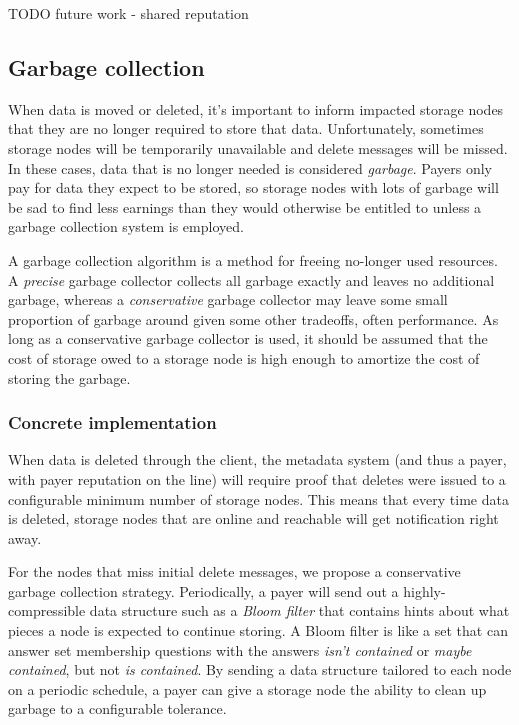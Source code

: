 \documentclass[a4paper,10pt]{article} \usepackage[utf8]{inputenc}
\newcommand{\todo}[1]{{\color{red} TODO #1 }}
\begin{document}
\todo{future work - shared reputation}

\subsection{Garbage collection}

When data is moved or deleted, it's important to inform impacted storage nodes
that they are no longer required to store that data. Unfortunately, sometimes
storage nodes will be temporarily unavailable and delete messages will be
missed. In these cases, data that is no longer needed is considered
{\em garbage}. Payers only pay for data they expect to be stored, so storage
nodes with lots of garbage will be sad to find less earnings than they would
otherwise be entitled to unless a garbage collection system is employed.

A garbage collection algorithm is a method for freeing no-longer used resources.
A {\em precise} garbage collector collects all garbage exactly and
leaves no additional garbage, whereas a {\em conservative} garbage collector may
leave some small proportion of garbage around given some other tradeoffs, often
performance. As long as a conservative garbage collector is used, it should
be assumed that the cost of storage owed to a storage node is high enough
to amortize the cost of storing the garbage.

\subsubsection{Concrete implementation}

When data is deleted through the client, the metadata system (and thus a payer,
with payer reputation on the line) will require proof that deletes were issued
to a configurable minimum number of storage nodes. This means that every time
data is deleted, storage nodes that are online and reachable will get
notification right away.

For the nodes that miss initial delete messages, we propose a conservative
garbage collection strategy. Periodically,
a payer will send out a highly-compressible data structure such as a
{\em Bloom filter} \cite{bloom-filter} that contains hints about what pieces
a node is expected to continue storing. A Bloom filter is like a set that can
answer set membership questions with the answers {\em isn't contained} or
{\em maybe contained}, but not {\em is contained}. By sending a data
structure tailored to each node on a periodic schedule, a payer can give a
storage node the ability to clean up garbage to a configurable tolerance.
\end{document}
